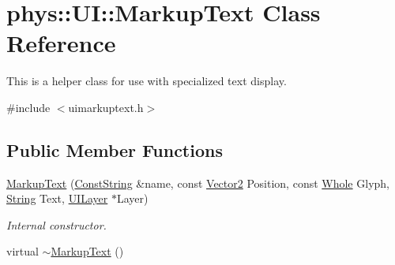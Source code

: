 \hypertarget{classphys_1_1UI_1_1MarkupText}{
\section{phys::UI::MarkupText Class Reference}
\label{d7/d23/classphys_1_1UI_1_1MarkupText}
}


This is a helper class for use with specialized text display.  




{\ttfamily \#include $<$uimarkuptext.h$>$}

\subsection*{Public Member Functions}
\begin{DoxyCompactItemize}
\item 
\hyperlink{classphys_1_1UI_1_1MarkupText_adc462bb1d0f8220ab309ef0844b6ebd5}{MarkupText} (\hyperlink{namespacephys_a5ce5049f8b4bf88d6413c47b504ebb31}{ConstString} \&name, const \hyperlink{classphys_1_1Vector2}{Vector2} Position, const \hyperlink{namespacephys_a460f6bc24c8dd347b05e0366ae34f34a}{Whole} Glyph, \hyperlink{namespacephys_aa03900411993de7fbfec4789bc1d392e}{String} Text, \hyperlink{classphys_1_1UILayer}{UILayer} $\ast$Layer)
\begin{DoxyCompactList}\small\item\em Internal constructor. \item\end{DoxyCompactList}\item 
\hypertarget{classphys_1_1UI_1_1MarkupText_a7c5d8033801123c938089ef9ca647f01}{
virtual \hyperlink{classphys_1_1UI_1_1MarkupText_a7c5d8033801123c938089ef9ca647f01}{$\sim$MarkupText} ()}
\label{d7/d23/classphys_1_1UI_1_1MarkupText_a7c5d8033801123c938089ef9ca647f01}


\end{DoxyCompactItemize}
